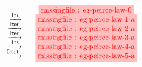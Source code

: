 \setlength{\fboxsep}{2pt}
\setlength{\arraycolsep}{0pt}
\newcommand{\vsp}{\vspace{-0.5em}}
\newcommand{\stkf}{\tikzfig{0.9}{0.45}}
$$
\begin{array}{r@{\quad}c@{\vsp}}
                             &\stkf{eg-peirce-law-0} \\
       \xstep{\mathsf{Ins}} &\stkf{eg-peirce-law-1-a} \\
       \xstep{\mathsf{Iter}} &\stkf{eg-peirce-law-2-a} \\
       \xstep{\mathsf{Iter}}  &\stkf{eg-peirce-law-3-a} \\
       \xstep{\mathsf{Ins}} &\stkf{eg-peirce-law-4-a} \\
       \xstep{\mathsf{Dcut}} &\stkf{eg-peirce-law-5-a} \\
\end{array}
$$
